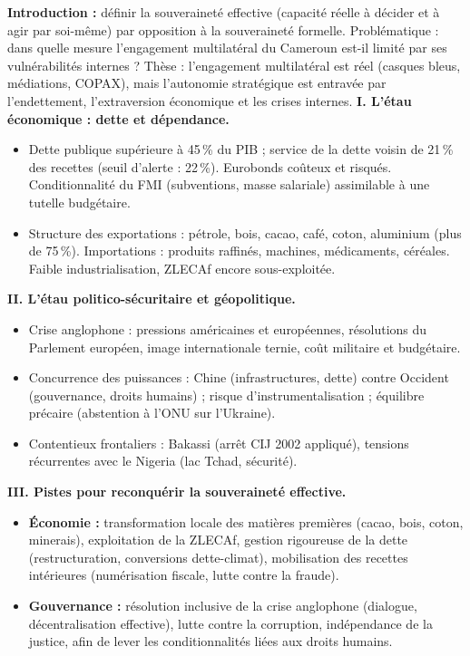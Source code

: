 \documentclass[11pt]{article}
\begin{document}
\begin{corrige}
\textbf{Introduction :} définir la souveraineté effective (capacité réelle à décider et à agir par soi-même) par opposition à la souveraineté formelle. Problématique : dans quelle mesure l'engagement multilatéral du Cameroun est-il limité par ses vulnérabilités internes ? Thèse : l'engagement multilatéral est réel (casques bleus, médiations, COPAX), mais l'autonomie stratégique est entravée par l'endettement, l'extraversion économique et les crises internes.
\textbf{I. L'étau économique : dette et dépendance.}
\begin{itemize}
    \item Dette publique supérieure à 45\,\% du PIB ; service de la dette voisin de 21\,\% des recettes (seuil d'alerte : 22\,\%). Eurobonds coûteux et risqués. Conditionnalité du FMI (subventions, masse salariale) assimilable à une tutelle budgétaire.
    \item Structure des exportations : pétrole, bois, cacao, café, coton, aluminium (plus de 75\,\%). Importations : produits raffinés, machines, médicaments, céréales. Faible industrialisation, ZLECAf encore sous-exploitée.
\end{itemize}
\textbf{II. L'étau politico-sécuritaire et géopolitique.}
\begin{itemize}
    \item Crise anglophone : pressions américaines et européennes, résolutions du Parlement européen, image internationale ternie, coût militaire et budgétaire.
    \item Concurrence des puissances : Chine (infrastructures, dette) contre Occident (gouvernance, droits humains) ; risque d'instrumentalisation ; équilibre précaire (abstention à l'ONU sur l'Ukraine).
    \item Contentieux frontaliers : Bakassi (arrêt CIJ 2002 appliqué), tensions récurrentes avec le Nigeria (lac Tchad, sécurité).
\end{itemize}
\textbf{III. Pistes pour reconquérir la souveraineté effective.}
\begin{itemize}
    \item \textbf{Économie :} transformation locale des matières premières (cacao, bois, coton, minerais), exploitation de la ZLECAf, gestion rigoureuse de la dette (restructuration, conversions dette-climat), mobilisation des recettes intérieures (numérisation fiscale, lutte contre la fraude).
    \item \textbf{Gouvernance :} résolution inclusive de la crise anglophone (dialogue, décentralisation effective), lutte contre la corruption, indépendance de la justice, afin de lever les conditionnalités liées aux droits humains.

\end{itemize}
\end{corrige}
\end{document}

